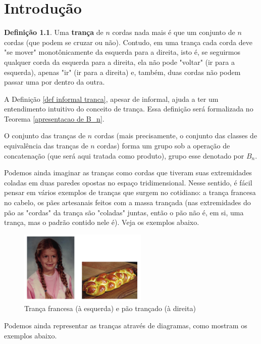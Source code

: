\documentclass[a4paper,portuguese,11pt,twoside, leqno]{book}
\theoremstyle{definition}
\newtheorem{deff}{Definição}[section]
\begin{document}
	\chapter{Introdução}
	\begin{deff}
		\label{def informal tranca}
		Uma \textbf{trança} de $n$ cordas nada mais é que um conjunto de $n$ cordas (que podem se cruzar ou não). Contudo, em uma trança cada corda deve "se mover" monotônicamente da esquerda para a direita, isto é, se seguirmos qualquer corda da esquerda para a direita, ela não pode "voltar" (ir para a esquerda), apenas "ir" (ir para a direita) e, também, duas cordas não podem passar uma por dentro da outra.
	\end{deff}
	
	\par\vspace{0.3cm} A Definição \eqref{def informal tranca}, apesar de informal, ajuda a ter um entendimento intuitivo do conceito de trança. Essa definição será formalizada no Teorema \eqref{apresentacao de B_n}.
	
	\par\vspace{0.3cm} O conjunto das tranças de $n$ cordas (mais precisamente, o conjunto das classes de equivalência das tranças de $n$ cordas) forma um grupo sob a operação de concatenação (que será aqui tratada como produto), grupo esse denotado por $B_n$. 
	\par\vspace{0.3cm} Podemos ainda imaginar as tranças como cordas que tiveram suas extremidades coladas em duas paredes opostas no espaço tridimensional. Nesse sentido, é fácil pensar em vários exemplos de tranças que surgem no cotidiano: a trança francesa no cabelo, os pães artesanais feitos com a massa trançada (nas extremidades do pão as "cordas" da trança são "coladas" juntas, então o pão não é, em si, uma trança, mas o padrão contido nele é). Veja os exemplos abaixo.
	
	\begin{figure}[H]
		\begin{center}
			\includegraphics[width=6.1cm]{exemplos_trancas.png}
		\end{center}
		\caption{Trança francesa (à esquerda) e pão trançado (à direita)}\label{exemplos de trancas}
	\end{figure}
	\par\vspace{0.3cm} Podemos ainda representar as tranças através de diagramas, como mostram os exemplos abaixo.
	
\end{document}
